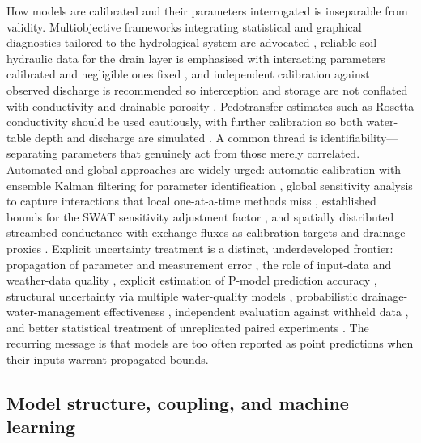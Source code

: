 \documentclass[11pt]{article}
\begin{document}
How models are calibrated and their parameters interrogated is inseparable from
validity. Multiobjective frameworks integrating statistical and graphical
diagnostics tailored to the hydrological system are advocated
\parencite{Bruhn2025}, reliable soil-hydraulic data for the drain layer is
emphasised with interacting parameters calibrated and negligible ones fixed
\parencite{Wang2006}, and independent calibration against observed discharge is
recommended so interception and storage are not conflated with conductivity and
drainable porosity \parencite{Henine2022}. Pedotransfer estimates such as
Rosetta conductivity should be used cautiously, with further calibration so both
water-table depth and discharge are simulated \parencite{Malota2022,Timalsina2023}.
A common thread is identifiability---separating parameters that genuinely act
from those merely correlated. Automated and global approaches are widely urged:
automatic calibration with ensemble Kalman filtering for parameter identification
\parencite{Warsta2014,Sadhukhan2019b,Singh2019b}, global sensitivity analysis to
capture interactions that local one-at-a-time methods miss
\parencite{Timalsina2023,Chelil2022,Kacimov2000}, established bounds for the
SWAT sensitivity adjustment factor \parencite{Moriasi2013b}, and spatially
distributed streambed conductance with exchange fluxes as calibration targets and
drainage proxies \parencite{Karan2021}. Explicit uncertainty treatment is a
distinct, underdeveloped frontier: propagation of parameter and measurement error
\parencite{Alzraiee2013b}, the role of input-data and weather-data quality
\parencite{Upadhyay2019,Tao2021}, explicit estimation of P-model prediction
accuracy \parencite{Radcliffe2015,Beauchemin2003}, structural uncertainty via
multiple water-quality models \parencite{Kujawa2020}, probabilistic
drainage-water-management effectiveness \parencite{Shedekar2021}, independent
evaluation against withheld data \parencite{Schoups2005}, and better statistical
treatment of unreplicated paired experiments \parencite{Pagliari2021,Andrus2014}.
The recurring message is that models are too often reported as point predictions
when their inputs warrant propagated bounds.

\subsection{Model structure, coupling, and machine learning}
\end{document}
